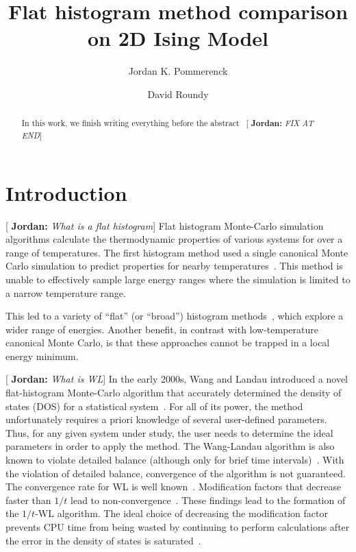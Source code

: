 \documentclass[letterpaper,twocolumn,amsmath,amssymb,pre,aps,10pt]{revtex4-1}
\newcommand{\blue}[1]{{\bf \color{blue} #1}}
\newcommand{\jpsays}[1]{{\color{red} [\blue{Jordan:} \emph{#1}]}}
\begin{document}
\title{Flat histogram method comparison on 2D Ising Model
}

\author{Jordan K. Pommerenck} \author{David Roundy}

\begin{abstract}
In this work, we finish writing everything before the abstract~\jpsays{FIX AT END}
\end{abstract}

\maketitle

\section{Introduction}
\jpsays{What is a flat histogram}
Flat histogram Monte-Carlo simulation algorithms calculate the
thermodynamic properties of various systems for over a range of
temperatures.  The first histogram method used a single canonical Monte
Carlo simulation to predict properties for nearby
temperatures~\cite{ferrenberg1988new}. This method is unable to
effectively sample large energy ranges where the simulation is limited
to a narrow temperature range.

This led to a
variety of ``flat'' (or ``broad'') histogram
methods~\cite{penna1996broad, penna1998broad, swendsen1999transition,
wang2001determining, wang2001efficient, trebst2004optimizing}, which
explore a wider range of energies.  Another benefit, in contrast with
low-temperature canonical Monte Carlo, is that these approaches cannot
be trapped in a local energy minimum.

\jpsays{What is WL}
In the early 2000s, Wang and Landau introduced a novel flat-histogram
Monte-Carlo algorithm that accurately determined the density of states
(DOS) for a statistical
system~\cite{wang2001determining,wang2001efficient}. For all of its
power, the method unfortunately requires a priori knowledge of several
user-defined parameters. Thus, for any given system under study, the
user needs to determine the ideal parameters in order to apply the
method. The Wang-Landau algorithm is also known to violate detailed
balance (although only for brief time intervals)~\cite{yan2003fast,
shell2002generalization}. With the violation of detailed balance,
convergence of the algorithm is not guaranteed. The convergence rate
for WL is well known~\cite{zhou2005understanding,lee2006convergence,
belardinelli2007wang}. Modification factors that decrease faster than
$1/t$ lead to non-convergence~\cite{belardinelli2007fast}.  These
findings lead to the formation of the $1/t$-WL algorithm.  The ideal
choice of decreasing the modification factor prevents CPU time from
being wasted by continuing to perform calculations after the error in
the density of states is saturated~\cite{belardinelli2008analysis}.
\end{document}

